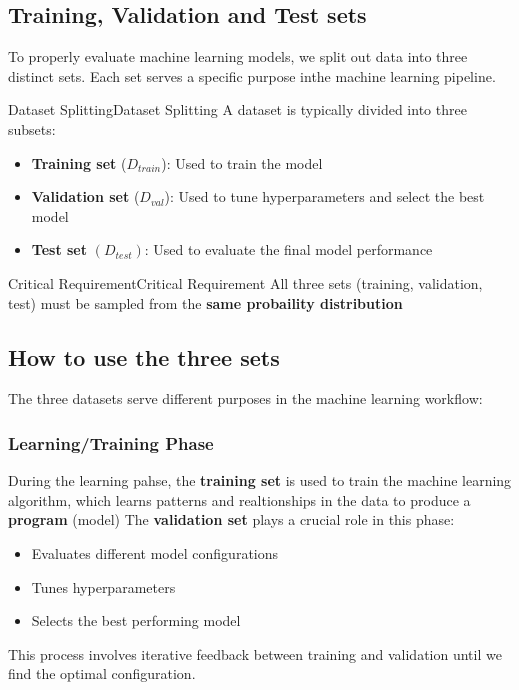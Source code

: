 \documentclass[a4paper]{article}
\theoremstyle{definition}
\begin{document}
\subsection{Training, Validation and Test sets}
To properly evaluate machine learning models, we split out data into three distinct sets. Each set serves a specific purpose 
inthe machine learning pipeline.
\begin{definition}{Dataset Splitting}{Dataset Splitting}
A dataset is typically divided into three subsets:
\begin{itemize}
    \item \textbf{Training set} (\( D_{train} \)): Used to train the model 
    \item \textbf{Validation set} (\( D_{val} \)): Used to tune hyperparameters and select the best model 
    \item \textbf{Test set} \( (D_{test}) \): Used to evaluate the final model performance
\end{itemize}
\end{definition}
\begin{definition}{Critical Requirement}{Critical Requirement}
All three sets (training, validation, test) must be sampled from the \textbf{same probaility distribution}
\end{definition}
\subsection{How to use the three sets}
The three datasets serve different purposes in the machine learning workflow:
\subsubsection{Learning/Training Phase}
During the learning pahse, the \textbf{training set} is used to train the machine learning algorithm, which learns patterns and realtionships 
in the data to produce a \textbf{program} (model)
\vspace{1em}
\noindent
\newline
The \textbf{validation set} plays a crucial role in this phase:
\begin{itemize}
    \item Evaluates different model configurations 
    \item Tunes hyperparameters 
    \item Selects the best performing model
\end{itemize}
This process involves iterative feedback between training and validation until we find the optimal configuration.
\end{document}
